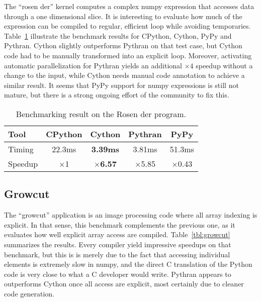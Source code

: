 \documentclass[10pt, onecolumn, preprint]{sigplanconf}
\begin{document}
The ``rosen der'' kernel computes a complex numpy expression that accesses
data through a one dimensional slice. It is interesting to evaluate how much of
the expression can be compiled to regular, efficient loop while avoiding
temporaries.  Table~\ref{tbl:rosen} illustrate the benchmark results for
CPython, Cython, PyPy and Pythran. Cython slightly outperforms Pythran on that
test case, but Cython code had to be manually transformed into an explicit
loop. Moreover, activating automatic parallelization for Pythran yields an
additional $\times4$ speedup without a change to the input, while Cython needs
manual code annotation to achieve a similar result. It seems that PyPy support
for numpy expressions is still not mature, but there is a
strong ongoing effort of the community to fix this.

\begin{table}
    \centering

    \begin{tabular}{|l|c|c|c|c|}
        \hline
     Tool    &  CPython    &   Cython     &     Pythran   &  PyPy \\
    \hline
    Timing  &  22.3ms   &   \textbf{3.39ms}     &    3.81ms &  51.3ms  \\
    \hline
    Speedup &  $\times$1         &    \textbf{$\times$6.57}      &    $\times$5.85   &  $\times$0.43    \\
    \hline
\end{tabular}
\caption{Benchmarking result on the Rosen der program.}
\label{tbl:rosen}

\end{table}

\subsection{Growcut}

The ``growcut'' application is an image processing code where all array indexing
is explicit. In that sense, this benchmark complements the previous
one, as it evaluates how well explicit array access are compiled.
Table~\ref{tbl:growcut} summarizes the results. Every compiler yield impressive
speedups on that benchmark, but this is is merely due to the fact that
accessing individual elements is extremely slow in numpy, and the direct C
translation of the Python code is very close to what a C developer would write.
Pythran appears to outperforms Cython once all access are explicit, most
certainly due to cleaner code generation.
\end{document}
